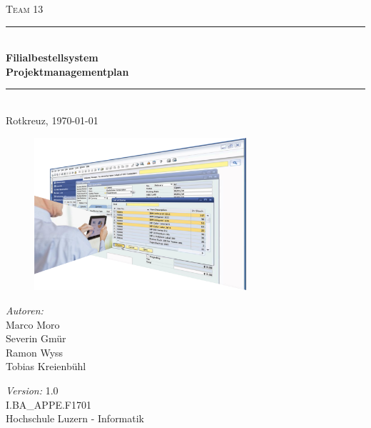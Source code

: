 \begin{titlepage}   

\begin{center}
\textsc{\Large Team 13}\\[0.5cm]

\newcommand{\HRule}{\rule{\linewidth}{0.5mm}}
\HRule \\[0.4cm]
{ \huge \bfseries Filialbestellsystem}\\[0.4cm]
{ \LARGE \bfseries Projektmanagementplan}\\[0.4cm]
\HRule \\[1.5cm]

{\large Rotkreuz, \today}

\begin{figure}[H]%
\centering
\includegraphics[width=0.7\textwidth]{Images/Titelbild.png}
\label{fig:title}
\end{figure}
\begin{minipage}{0.4\textwidth}
\begin{flushleft} \large
\emph{Autoren:}\\
Marco Moro\\
Severin Gmür\\
Ramon Wyss\\
Tobias Kreienbühl\\
\end{flushleft}
\end{minipage}
\hfill
\begin{minipage}{0.4\textwidth}
\begin{flushright} \large
\end{flushright}
\end{minipage}
\large
\vfill
\emph{Version:} 1.0\\
I.BA\_APPE.F1701 \\
Hochschule Luzern - Informatik

\end{center}

\end{titlepage}
